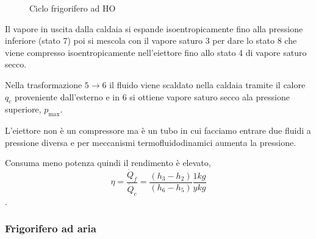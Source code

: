 \documentclass[a4paper]{article}
\numberwithin{equation}{section}%
\begin{document}
\begin{figure}[H]
	\begin{center}
	\end{center}
	\caption{Ciclo frigorifero ad HO}
\end{figure}

Il vapore in uscita dalla caldaia si espande isoentropicamente fino alla pressione inferiore (stato 7) poi si mescola con il vapore saturo 3 per dare lo stato 8 che viene compresso isoentropicamente nell'eiettore fino allo stato 4 di vapore saturo secco.

Nella trasformazione $5\to6$ il fluido viene scaldato nella caldaia tramite il calore $q_c$ proveniente dall'esterno e in 6 si ottiene vapore saturo secco ala pressione superiore, $p_{\max}$. 

L'eiettore non è un compressore ma è un tubo in cui facciamo entrare due fluidi a pressione diversa e per meccanismi termofluidodinamici aumenta la pressione. 

Consuma meno potenza quindi il rendimento è elevato, $$\eta=\frac{\dot{Q}_{f}}{\dot{Q}_{c}}=\frac{\left(h_{3}-h_{2}\right)}{\left(h_{6}-h_{5}\right)} \frac{1 k g}{y k g}$$.


\subsubsection{Frigorifero ad aria}
\end{document}
